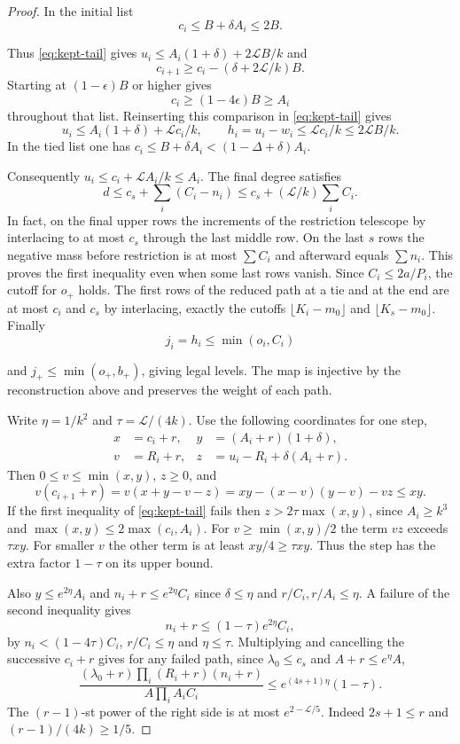 \begin{proof}
In the initial list
\[
 c_i\le B+\delta A_i\le2B.
\]

Thus \eqref{eq:kept-tail} gives
\(u_i\le A_i(1+\delta)+2\mathcal L B/k\) and
\[
 c_{i+1}\ge c_i-(\delta+2\mathcal L/k)B.
\]
Starting at
\((1-\epsilon)B\) or higher gives
\[
 c_i\ge(1-4\epsilon)B\ge A_i
\]
throughout that list.
Reinserting this comparison in \eqref{eq:kept-tail} gives
\[
 u_i\le A_i(1+\delta)+\mathcal L c_i/k,\qquad h_i=u_i-w_i\le\mathcal L c_i/k\le2\mathcal L B/k.
\]
In the tied list one has
\(c_i\le B+\delta A_i<(1-\Delta+\delta)A_i\).

Consequently \(u_i\le c_i+\mathcal L A_i/k\le A_i\).
The final degree satisfies
\[
 d\le c_s+\sum_i(C_i-n_i)\le c_s+(\mathcal L/k)\sum_i C_i.
\]
In fact, on the final upper rows the increments of the
restriction telescope by interlacing to at most \(c_s\)
through the last middle row. On the last \(s\) rows the
negative mass before restriction is at most \(\sum C_i\)
and afterward equals \(\sum n_i\). This proves the first
inequality even when some last rows vanish. Since
\(C_i\le 2a/P_i\), the cutoff for \(o_+\) holds.
The first rows of the reduced path at a tie and at the end
are at most \(c_i\) and \(c_s\) by interlacing, exactly the
cutoffs \(\lfloor K_i-m_0\rfloor\) and
\(\lfloor K_s-m_0\rfloor\). Finally
\[
 j_i=h_i\le\min(o_i,C_i)
\]

and \(j_+\le\min(o_+,b_+)\), giving legal levels. The map is
injective by the reconstruction above and preserves the
weight of each path.

Write \(\eta=1/k^2\) and \(\tau=\mathcal L/(4k)\). Use the following coordinates for one step,
\[
 \begin{aligned} x&=c_i+r, & y&=(A_i+r)(1+\delta),\\ v&=R_i+r, & z&=u_i-R_i+\delta(A_i+r).\end{aligned}
\]
Then
\(0\le v\le\min(x,y)\), \(z\ge0\), and
\[
 v(c_{i+1}+r)=v(x+y-v-z)
             =xy-(x-v)(y-v)-vz\le xy .
\]
If the first inequality of \eqref{eq:kept-tail} fails then
\(z>2\tau\max(x,y)\), since \(A_i\ge k^3\) and
\(\max(x,y)\le2\max(c_i,A_i)\).
For \(v\ge\min(x,y)/2\) the term \(vz\) exceeds \(\tau xy\).
For smaller \(v\) the other term is at least \(xy/4\ge\tau xy\).
Thus the step has the extra factor \(1-\tau\) on its upper
bound.

Also \(y\le e^{2\eta} A_i\) and
\(n_i+r\le e^{2\eta} C_i\) since \(\delta\le\eta\) and
\(r/C_i,r/A_i\le\eta\). A failure of the second inequality
gives
\[
 n_i+r\le (1-\tau)e^{2\eta} C_i,
\]
by
\(n_i<(1-4\tau)C_i\), \(r/C_i\le\eta\) and \(\eta\le\tau\).
Multiplying and cancelling the successive \(c_i+r\) gives
for any failed path, since \(\lambda_0\le c_s\) and
\(A+r\le e^\eta A\),
\[
 \frac{(\lambda_0+r)\prod_i(R_i+r)(n_i+r)}{A\prod_i A_iC_i}
 \le e^{(4s+1)\eta}(1-\tau).
\]
The \((r-1)\)-st power of the right side is at most
\(e^{2-\mathcal L/5}\). Indeed \(2s+1\le r\) and
\((r-1)/(4k)\ge1/5\).


\end{proof}
